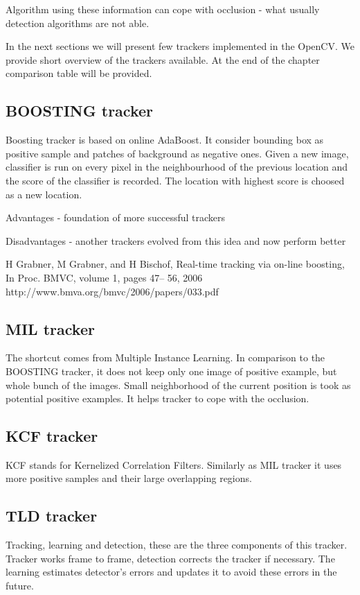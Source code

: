 Algorithm using these information can cope with occlusion - what usually
detection algorithms are not able.

In the next sections we will present few trackers implemented in the OpenCV. We
provide short overview of the trackers available. At the end of the chapter
comparison table will be provided.

\subsection{BOOSTING tracker}
Boosting tracker is based on online AdaBoost. It consider bounding box as
positive sample and patches of background as negative ones. Given a new image,
classifier is run on every pixel in the neighbourhood of the previous location
and the score of the classifier is recorded. The location with highest score is
choosed as a new location. 

Advantages
- foundation of more successful trackers 

Disadvantages
- another trackers evolved from this idea and now perform better

H Grabner, M Grabner, and H Bischof, Real-time tracking via on-line boosting, In Proc. BMVC, volume 1, pages 47– 56, 2006
http://www.bmva.org/bmvc/2006/papers/033.pdf


\subsection{MIL tracker}
The shortcut comes from Multiple Instance Learning. In comparison to the
BOOSTING tracker, it does not keep only one image of positive example, but
whole bunch of the images. Small neighborhood of the current position is took
as potential positive examples. It helps tracker to cope with the occlusion.

\subsection{KCF tracker}
KCF stands for Kernelized Correlation Filters. Similarly as MIL tracker it uses
more positive samples and their large overlapping regions. 

\subsection{TLD tracker}
Tracking, learning and detection, these are the three components of this
tracker. Tracker works frame to frame, detection corrects the tracker if
necessary. The learning estimates detector's errors and updates it to avoid
these errors in the future.


